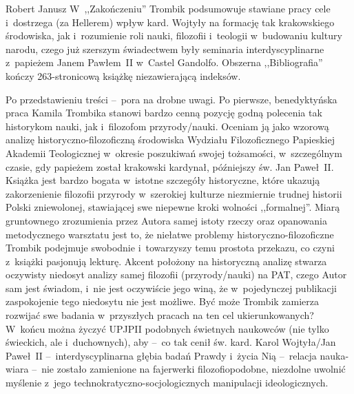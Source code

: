 \begin{newrevplenv}{Robert Janusz}
W~,,Zakończeniu'' Trombik podsumowuje stawiane pracy cele i~dostrzega (za Hellerem) wpływ kard. Wojtyły na formację tak krakowskiego środowiska, jak i~rozumienie roli nauki, filozofii i~teologii w~budowaniu kultury narodu, czego już szerszym świadectwem były seminaria interdyscyplinarne z~papieżem Janem Pawłem~II w~Castel Gandolfo. Obszerna ,,Bibliografia'' kończy 263-stronicową książkę niezawierającą indeksów.

Po przedstawieniu treści --~pora na drobne uwagi. Po pierwsze, benedyktyńska praca Kamila Trombika stanowi bardzo cenną pozycję godną polecenia tak historykom nauki, jak i~filozofom przyrody/nauki. Oceniam ją jako wzorową analizę historyczno-filozoficzną środowiska Wydziału Filozoficznego Papieskiej Akademii Teologicznej w~okresie poszukiwań swojej tożsamości, w~szczególnym czasie, gdy papieżem został krakowski kardynał, późniejszy św. Jan Paweł~II. Książka jest bardzo bogata w~istotne szczegóły historyczne, które ukazują zakorzenienie filozofii przyrody w~szerokiej kulturze niezmiernie trudnej historii Polski zniewolonej, stawiającej swe niepewne kroki wolności ,,formalnej''. Miarą gruntownego zrozumienia przez Autora samej istoty rzeczy oraz opanowania metodycznego warsztatu jest to, że niełatwe problemy historyczno-filozoficzne Trombik podejmuje swobodnie i~towarzyszy temu prostota przekazu, co czyni z~książki pasjonują lekturę. Akcent położony na historyczną analizę stwarza oczywisty niedosyt analizy samej filozofii (przyrody/nauki) na PAT, czego Autor sam jest świadom, i~nie jest oczywiście jego winą, że w~pojedynczej publikacji zaspokojenie tego niedosytu nie jest możliwe. Być może Trombik zamierza rozwijać swe badania w~przyszłych pracach na ten cel ukierunkowanych? W~końcu można życzyć UPJPII podobnych świetnych naukowców (nie tylko świeckich, ale i~duchownych), aby --~co tak cenił św. kard. Karol Wojtyła/Jan Paweł~II --~interdyscyplinarna głębia badań Prawdy i~życia Nią --~relacja nauka-wiara --~nie zostało zamienione na fajerwerki filozofiopodobne, niezdolne uwolnić myślenie z~jego technokratyczno-socjologicznych manipulacji ideologicznych.





\vspace{5mm}%
\begin{flushright}
{\chaptitleeng\color{black!50}{An important step towards an understanding of the type of the philosophy at the Center of Interdisciplinary Studies}}
\end{flushright}


\end{newrevplenv}
